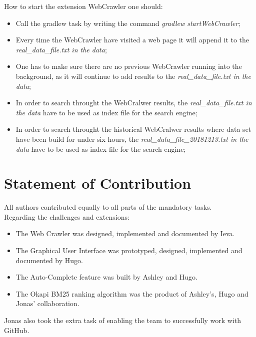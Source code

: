 How to start the extension WebCrawler one should:
\begin{itemize}

    \item Call the gradlew task by writing the command  \textit{gradlew startWebCrawler};
    \item Every time the WebCrawler have visited a web page it will append it to the \textit{real\_data\_file.txt in the data};
    \item One has to make sure there are no previous WebCrawler running into the background, as it will continue to add results to the \textit{real\_data\_file.txt in the data};
    \item In order to search throught the WebCralwer results, the \textit{real\_data\_file.txt in the data} have to be used as index file for the search engine;
    \item In order to search throught the historical WebCralwer results where data set have been build for under six hours, the \textit{real\_data\_file\_20181213.txt in the data} have to be used as index file for the search engine;

\end{itemize}

\section{Statement of Contribution}
\label{sec:Statement of Contribution}
All authors contributed equally to all parts of the mandatory tasks.\\
Regarding the challenges and extensions:
\begin{itemize}
    \item The Web Crawler was designed, implemented and documented by Ieva.
    \item The Graphical User Interface was prototyped, designed, implemented and documented by Hugo.
    \item The Auto-Complete feature was built by Ashley and Hugo.
    \item The Okapi BM25 ranking algorithm was the product of Ashley's, Hugo and Jonas' collaboration.
\end{itemize}
Jonas also took the extra task of enabling the team to successfully work with GitHub.